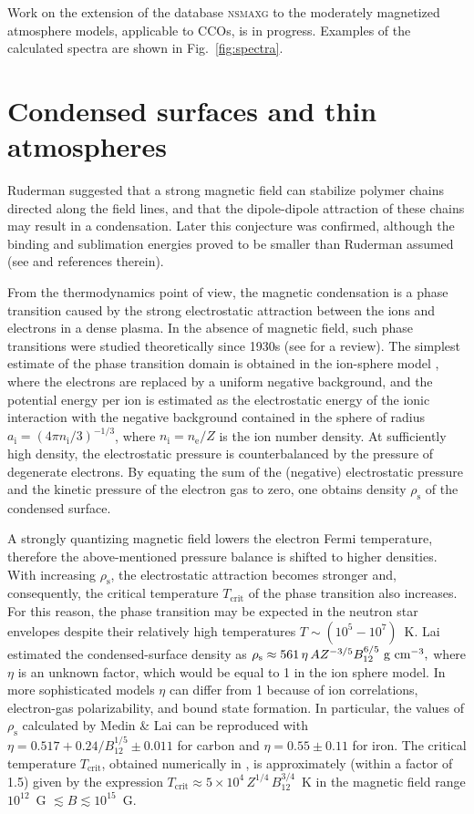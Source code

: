 \documentclass{pos1}
\newcommand{\aion}{a_\mathrm{i}}
\newcommand{\gcc}{\mbox{g~cm$^{-3}$}}
\newcommand{\nel}{n_\mathrm{e}}
\newcommand{\nion}{n_\mathrm{i}}
\newcommand{\rhos}{\rho_\mathrm{s}}
\newcommand{\Tc}{T_\mathrm{crit}}
\begin{document}
Work on the extension of the database  \textsc{nsmaxg} to the
moderately magnetized atmosphere models, applicable to CCOs, is in
progress. Examples of the calculated spectra are shown in
Fig.~\ref{fig:spectra}.

\section{Condensed surfaces and thin atmospheres}
\label{sec:cond}

Ruderman \cite{Ruderman71} suggested that a strong magnetic field can
stabilize polymer chains directed along the field lines, and that the
dipole-dipole attraction of these chains may result in a condensation.
Later this conjecture was confirmed, although the binding and
sublimation energies proved to be smaller than Ruderman assumed (see
\cite{MedinLai06b} and references therein).

From the thermodynamics point of view, the magnetic condensation is a
phase transition caused by the strong electrostatic attraction between
the ions and electrons in a dense plasma. In the absence of magnetic
field, such phase transitions were studied theoretically since 1930s
(see \cite{PPT} for a review). The simplest estimate of the phase
transition domain is obtained in the ion-sphere model
\cite{Salpeter61}, where the electrons are replaced by a uniform
negative background, and the potential energy per ion is estimated as
the electrostatic energy of the ionic interaction with the negative
background contained in the sphere of radius
$\aion=(4\pi\nion/3)^{-1/3}$, where $\nion=\nel/Z$ is the ion number
density. At sufficiently high density, the electrostatic
pressure is counterbalanced by the pressure of degenerate electrons.
By equating the sum of the (negative) electrostatic pressure and the
kinetic pressure of the electron gas to zero, one obtains density
$\rhos$ of the condensed surface.

A strongly quantizing magnetic field lowers the electron Fermi
temperature, therefore the above-mentioned pressure balance is shifted
to higher densities. With increasing $\rhos$, the electrostatic
attraction becomes stronger and, consequently, the critical
temperature $\Tc$ of the phase transition also increases. For this
reason, the phase transition may be expected in the neutron star
envelopes  despite their relatively high temperatures
$T\sim(10^5-10^7)$~K. Lai \cite{Lai01} estimated the condensed-surface
density as  $ \rhos\approx 561\,\eta\,A Z^{-3/5}
B_{12}^{6/5}\mbox{~\gcc}, $ where $\eta$ is an unknown factor, which
would be equal to 1 in the ion sphere model. In more sophisticated
models $\eta$ can differ from 1 because of ion correlations,
electron-gas polarizability, and bound state formation. In particular,
the values of $\rhos$ calculated by Medin \& Lai
\cite{MedinLai06b,MedinLai07} can be reproduced with
$\eta=0.517+0.24/B_{12}^{1/5}\pm0.011$ for carbon and
$\eta=0.55\pm0.11$ for iron. The critical temperature $\Tc$, obtained
numerically in \cite{MedinLai06b,MedinLai07}, is approximately (within
a factor of 1.5) given by the expression $\Tc \approx
5\times10^4\,Z^{1/4}\,B_{12}^{3/4}$~K in the  magnetic field range
$10^{12}$~G $\lesssim B \lesssim 10^{15}$~G.
\end{document}
